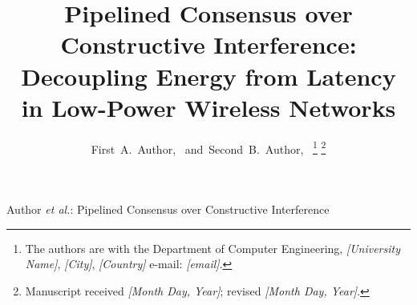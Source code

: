 \documentclass[journal]{IEEEtran}
\begin{document}
\title{Pipelined Consensus over Constructive Interference:\\
Decoupling Energy from Latency in Low-Power Wireless Networks}

\author{First~A.~Author,~
and~Second~B.~Author,~%
\thanks{The authors are with the Department of Computer Engineering,
\textit{[University Name]}, \textit{[City]}, \textit{[Country]}
e-mail: \textit{[email]}.}%
\thanks{Manuscript received \textit{[Month Day, Year]};
revised \textit{[Month Day, Year]}.}}

%
{Author \MakeLowercase{\textit{et al.}}: Pipelined Consensus over Constructive Interference}


\maketitle
\end{document}
